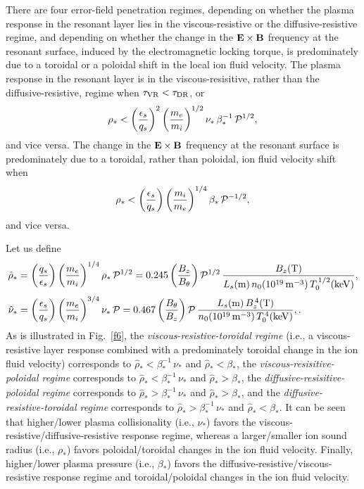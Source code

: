 \documentclass[12pt,prb,aps]{revtex4-1}
\begin{document}
There are four error-field penetration regimes, depending on whether the plasma response in the resonant layer lies 
in the viscous-resistive or the diffusive-resistive regime, and depending on whether the change in the ${\bf E}\times{\bf B}$
frequency at the resonant surface, induced by the electromagnetic locking torque,  is
predominately due to a toroidal or a poloidal shift in the local ion fluid velocity. The plasma response in the resonant layer is in the
viscous-resisitive, rather than the diffusive-resistive, regime when $\tau_{\rm VR}<\tau_{\rm DR}$, or
\begin{equation}
\rho_\ast < \left(\frac{\epsilon_s}{q_s}\right)^2\left(\frac{m_e}{m_i}\right)^{1/2}\nu_\ast\,\beta_\ast^{-1}\,{\cal P}^{1/2},
\end{equation}
and vice versa. The change in the ${\bf E}\times{\bf B}$ frequency at the resonant surface is predominately due to a toroidal, rather than poloidal, ion fluid velocity shift when
\begin{equation}
\rho_\ast < \left(\frac{\epsilon_s}{q_s}\right)\left(\frac{m_i}{m_e}\right)^{1/4}\beta_\ast\,{\cal P}^{-1/2},
\end{equation}
and vice versa. 

Let us define 
\begin{align}
\hat{\rho}_\ast&= \left(\frac{q_s}{\epsilon_s}\right)\left(\frac{m_e}{m_i}\right)^{1/4}\rho_\ast\,{\cal P}^{1/2}= 0.245\left(\frac{B_z}{B_\theta}\right)
{\cal P}^{1/2}\,\frac{B_z({\rm T})}{L_s({\rm m})\,n_0(10^{19}\,{\rm m}^{-3})\,T_0^{\,1/2}({\rm keV})},
\\[0.5ex]
\hat{\nu}_\ast&=\left(\frac{\epsilon_s}{q_s}\right)\left(\frac{m_e}{m_i}\right)^{3/4}\nu_\ast\,{\cal P}= 0.467\left(\frac{B_\theta}{B_z}\right)
{\cal P}\,\frac{L_s({\rm m})\,B_z^{\,4}({\rm T})}{n_0(10^{19}\,{\rm m}^{-3})\,T_0^{\,4}({\rm keV})},.
\end{align}
As is illustrated in Fig.~\ref{f6}, the {\em viscous-resistive-toroidal regime}\/ (i.e., a viscous-resistive layer response
combined with a predominately toroidal change in the ion fluid velocity) corresponds to $\hat{\rho}_\ast < \beta_\ast^{-1}\,\nu_\ast$ 
and $\hat{\rho}_\ast <\beta_\ast$, the {\em viscous-resisitive-poloidal regime}\/ corresponds to 
 $\hat{\rho}_\ast<\beta_\ast^{-1}\,\nu_\ast$ and $\hat{\rho}_\ast > \beta_\ast$, the {\em diffusive-resisitive-poloidal regime}\/ corresponds to  
 $\hat{\rho}_\ast>\beta_\ast^{-1}\,\nu_\ast$ and $\hat{\rho}_\ast > \beta_\ast$, and the {\em diffusive-resistive-toroidal regime}\/ corresponds to   
 $\hat{\rho}_\ast>\beta_\ast^{-1}\,\nu_\ast$ and $\hat{\rho}_\ast < \beta_\ast$.
It can be seen that higher/lower plasma collisionality (i.e., $\nu_\ast$) favors the viscous-resistive/diffusive-resistive response regime, whereas a
larger/smaller ion sound radius (i.e., $\rho_\ast$) favors poloidal/toroidal changes in the ion fluid velocity. Finally, higher/lower plasma
pressure (i.e., $\beta_\ast$) 
favors the diffusive-resistive/viscous-resistive response regime and toroidal/poloidal changes in the ion fluid velocity. 
\end{document}
